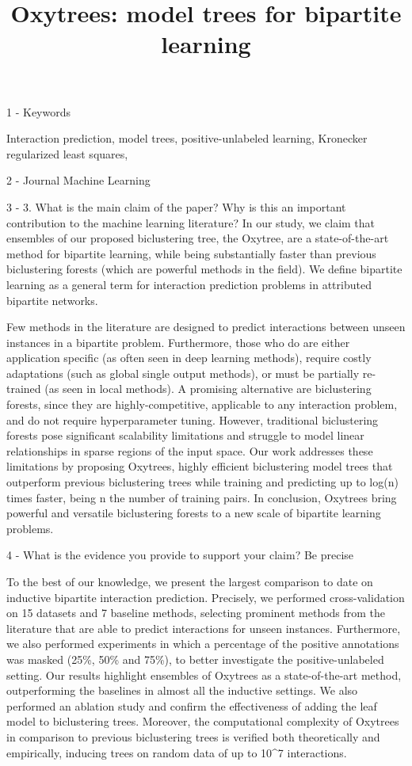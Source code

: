 \documentclass[sn-mathphys-num]{sn-jnl}
\begin{document}
\title[Oxytrees]{Oxytrees: model trees for bipartite learning}
1 -  Keywords

Interaction prediction, model trees, positive-unlabeled learning, Kronecker regularized least squares,  

2 -  Journal
Machine Learning


3 -  3. What is the main claim of the paper? Why is this an important contribution to the machine learning literature?  
In our study, we claim that ensembles of our proposed biclustering tree, the Oxytree, are a state-of-the-art method for bipartite learning, while being substantially faster than previous biclustering forests (which are powerful methods in the field).
We define bipartite learning as a general term for interaction prediction problems in attributed bipartite networks.

Few methods in the literature are designed to predict interactions between unseen instances in a bipartite problem. Furthermore, those who do are either application specific (as often seen in deep learning methods), require costly adaptations (such as global single output methods), or must be partially re-trained (as seen in local methods). A promising alternative are biclustering forests, since they are highly-competitive, applicable to any interaction problem, and do not require hyperparameter tuning. However, traditional biclustering forests pose significant scalability limitations and struggle to model linear relationships in sparse regions of the input space.
Our work addresses these limitations by proposing Oxytrees, highly efficient biclustering model trees that outperform previous biclustering trees while training and predicting up to log(n) times faster, being n the number of training pairs.
%
In conclusion, Oxytrees bring powerful and versatile biclustering forests to a new scale of bipartite learning problems.


4 - What is the evidence you provide to support your claim? Be precise

To the best of our knowledge, we present the largest comparison to date on inductive bipartite interaction prediction. Precisely, we performed cross-validation on 15 datasets and 7 baseline methods, selecting prominent methods from the literature that are able to predict interactions for unseen instances. Furthermore, we also performed experiments in which a percentage of the positive annotations was masked (25\%, 50\% and 75\%), to better investigate the positive-unlabeled setting. Our results highlight ensembles of Oxytrees as a state-of-the-art method, outperforming the baselines in almost all the inductive settings.
We also performed an ablation study and confirm the effectiveness of adding the leaf model to biclustering trees.
Moreover, the computational complexity of Oxytrees in comparison to previous biclustering trees is verified both theoretically and empirically, inducing trees on random data of up to 10^7 interactions.
\end{document}
